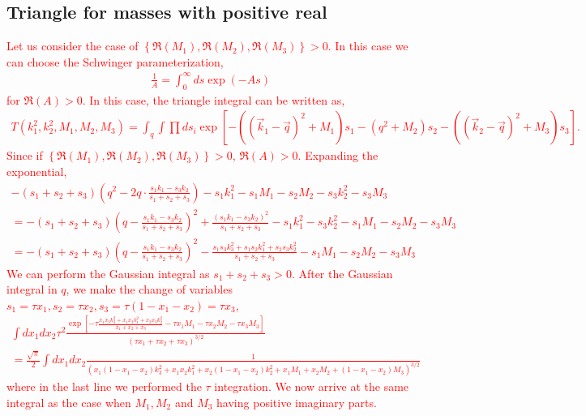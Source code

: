 \documentclass[twoside]{article}
\begin{document}
\subsection{Triangle for masses with positive real}
\textcolor{red}{Let us consider the case of $\left\{ \Re(M_1),\Re(M_2),\Re(M_3) \right\} > 0$. In this case we can choose the Schwinger parameterization,
\begin{align}
  \frac{1}{A} = \int^{\infty}_0ds \exp(-As)
\end{align}
for $\Re(A)>0$. In this case, the triangle integral can be written as,
\begin{align}
  T(k^2_1,k^2_2,M_1,M_2,M_3) = \int_{q}\int \prod ds_i \exp\left[ -\left((\vec{k}_1 - \vec{q})^2 + M_1\right)s_1 - (q^2 + M_2)s_2 - \left(
  (\vec{k}_2 - \vec{q})^2 + M_3 \right)s_3 \right].
\end{align}
Since if $\left\{ \Re(M_1),\Re(M_2),\Re(M_3) \right\}> 0$, $\Re(A)>0$. Expanding the exponential,
\begin{align}
  -(s_1 + s_2 + s_3)\left( q^2 - 2q\cdot\frac{s_1k_1 - s_3k_2}{s_1 + s_2 + s_3} \right) - s_1k^2_1 - s_1M_1 - s_2M_2 - s_3k^2_2 - s_3M_3\\
  = -(s_1 + s_2 + s_3)\left(q - \frac{s_1k_1 - s_3k_2}{s_1 + s_2 + s_3}\right)^2 + \frac{(s_1k_1 - s_3k_2)^2}{s_1 + s_2 + s_3} -s_1k^2_1 - s_3k^2_2 -
  s_1M_1 - s_2M_2 - s_3M_3\\
  = -(s_1 + s_2 + s_3)\left( q - \frac{s_1k_1 - s_3k_2}{s_1 + s_2 + s_3} \right)^2 - \frac{s_1s_3k^2_3 + s_1s_2k^2_1 +
  s_2s_3k^2_2}{s_1 + s_2 + s_3} - s_1M_1 - s_2M_2 - s_3M_3
\end{align}
We can perform the Gaussian integral as $s_1 + s_2 + s_3 > 0$. After the Gaussian integral in $q$, we make the change of variables $s_1 = \tau x_1, s_2 = \tau x_2, s_3 = \tau(1 - x_1 - x_2) = \tau x_3$,
\begin{align}
  \int dx_1dx_2\tau^2\frac{\exp\left[ -\tau\frac{x_1x_3k^2_3 + x_1x_2k^2_1 + x_2x_3k^2_2}{x_1 + x_2 + x_3} - \tau x_1M_1 - \tau x_2M_2 - \tau x_3M_3
  \right]}{(\tau x_1 + \tau x_2 + \tau x_3)^{3/2}}\\
  = \frac{\sqrt{\pi}}{2}\int dx_1dx_2 \frac{1}{\left(x_1(1 - x_1 - x_2)k^2_3 + x_1x_2k^2_1 + x_2(1 - x_1 - x_2)k^2_2 + x_1M_1 + x_2M_2 +
  (1 - x_1 - x_2)M_3\right)^{3/2}}
\end{align}
where in the last line we performed the $\tau$ integration. We now arrive at the same integral as the case when $M_1, M_2$ and $M_3$ having
positive imaginary parts.}
\end{document}
